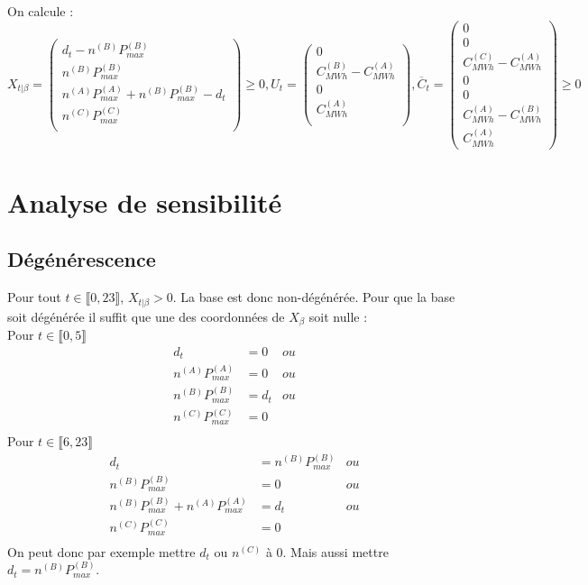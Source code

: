 \documentclass{article}
\begin{document}
On calcule :
$$
X_{t|\beta} = \left(
\begin{array}{c}
    d_t - n^{(B)}P_{max}^{(B)} \\
    n^{(B)}P_{max}^{(B)} \\
    n^{(A)}P_{max}^{(A)}+n^{(B)}P_{max}^{(B)} - d_t \\
    n^{(C)}P_{max}^{(C)} \\
\end{array}
\right)\geq 0
,
U_t = \left(
\begin{array}{c}
    0 \\
    C_{MWh}^{(B)}-C_{MWh}^{(A)} \\
    0 \\
    C_{MWh}^{(A)} \\
\end{array}
\right),
\overline{C}_t=\left(
\begin{array}{c}
    0 \\
    0 \\
    C_{MWh}^{(C)} - C_{MWh}^{(A)} \\
    0 \\
    0 \\
    C_{MWh}^{(A)} - C_{MWh}^{(B)} \\
    C_{MWh}^{(A)}
\end{array}
\right)\geq 0
$$

\begin{center}
\end{center}
\section{Analyse de sensibilité}
\subsection{Dégénérescence}
Pour tout $t \in\llbracket 0,23 \rrbracket$, $X_{t|\beta} > 0$. La base est donc non-dégénérée.
Pour que la base soit dégénérée il suffit que une des coordonnées de $X_{\beta}$ soit nulle :\\
Pour $t\in\llbracket 0,5 \rrbracket$
$$
\left.
\begin{array}{ccc}
    d_t &= 0&ou\\
    n^{(A)}P_{max}^{(A)} &= 0&ou \\
    n^{(B)}P_{max}^{(B)} &= d_t&ou \\
    n^{(C)}P_{max}^{(C)} & = 0&\\
\end{array}
\right.
$$
Pour $t\in\llbracket 6,23 \rrbracket$
$$
\left.
\begin{array}{ccc}
    d_t & = n^{(B)}P_{max}^{(B)} &ou\\
    n^{(B)}P_{max}^{(B)} & = 0&ou \\
    n^{(B)}P_{max}^{(B)}+n^{(A)}P_{max}^{(A)} &= d_t&ou \\
    n^{(C)}P_{max}^{(C)} & = 0&\\
\end{array}
\right.
$$
On peut donc par exemple mettre $d_t$ ou $n^{(C)}$ à 0. Mais aussi mettre $d_t=n^{(B)}P_{max}^{(B)}$.
\end{document}
